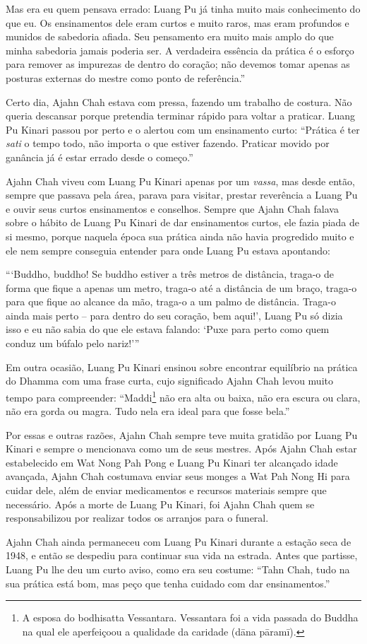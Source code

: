 Mas era eu quem pensava errado: Luang Pu já tinha muito mais
conhecimento do que eu. Os ensinamentos dele eram curtos e muito raros,
mas eram profundos e munidos de sabedoria afiada. Seu pensamento era
muito mais amplo do que minha sabedoria jamais poderia ser. A verdadeira
essência da prática é o esforço para remover as impurezas de dentro do
coração; não devemos tomar apenas as posturas externas do mestre como
ponto de referência.''

Certo dia, Ajahn Chah estava com pressa, fazendo um trabalho de costura.
Não queria descansar porque pretendia terminar rápido para voltar a
praticar. Luang Pu Kinari passou por perto e o alertou com um
ensinamento curto: ``Prática é ter \emph{sati} o tempo todo, não importa
o que estiver fazendo. Praticar movido por ganância já é estar errado
desde o começo.''

Ajahn Chah viveu com Luang Pu Kinari apenas por um \emph{vassa}, mas
desde então, sempre que passava pela área, parava para visitar, prestar
reverência a Luang Pu e ouvir seus curtos ensinamentos e conselhos.
Sempre que Ajahn Chah falava sobre o hábito de Luang Pu Kinari de dar
ensinamentos curtos, ele fazia piada de si mesmo, porque naquela época
sua prática ainda não havia progredido muito e ele nem sempre conseguia
entender para onde Luang Pu estava apontando:

``\thinspace `Buddho, buddho! Se buddho estiver a três metros de distância, traga-o
de forma que fique a apenas um metro, traga-o até a distância de um
braço, traga-o para que fique ao alcance da mão, traga-o a um palmo de
distância. Traga-o ainda mais perto -- para dentro do seu coração, bem
aqui!', Luang Pu só dizia isso e eu não sabia do que ele estava falando:
`Puxe para perto como quem conduz um búfalo pelo nariz!'\thinspace ''

Em outra ocasião, Luang Pu Kinari ensinou sobre encontrar equilíbrio na
prática do Dhamma com uma frase curta, cujo significado Ajahn Chah levou
muito tempo para compreender: ``Maddi\footnote{A esposa do bodhisatta
  Vessantara. Vessantara foi a vida passada do Buddha na qual ele
  aperfeiçoou a qualidade da caridade (dāna pāramī).} não era alta ou
baixa, não era escura ou clara, não era gorda ou magra. Tudo nela era
ideal para que fosse bela.''

Por essas e outras razões, Ajahn Chah sempre teve muita gratidão por
Luang Pu Kinari e sempre o mencionava como um de seus mestres. Após
Ajahn Chah estar estabelecido em Wat Nong Pah Pong e Luang Pu Kinari ter
alcançado idade avançada, Ajahn Chah costumava enviar seus monges a Wat
Pah Nong Hi para cuidar dele, além de enviar medicamentos e recursos
materiais sempre que necessário. Após a morte de Luang Pu Kinari, foi
Ajahn Chah quem se responsabilizou por realizar todos os arranjos para o
funeral.

Ajahn Chah ainda permaneceu com Luang Pu Kinari durante a estação seca
de 1948, e então se despediu para continuar sua vida na estrada. Antes
que partisse, Luang Pu lhe deu um curto aviso, como era seu costume:
``Tahn Chah, tudo na sua prática está bom, mas peço que tenha cuidado
com dar ensinamentos.''

